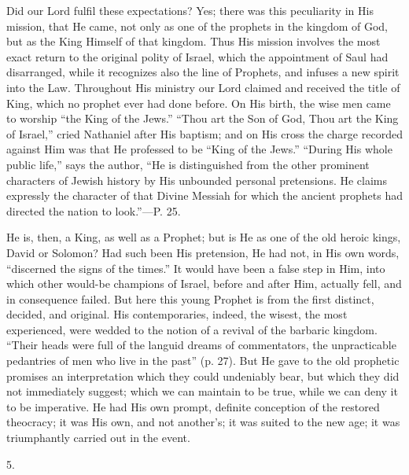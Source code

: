 Did our Lord fulfil these expectations? Yes;
there was this peculiarity in His mission, that He came, not only as
one of the prophets in the kingdom of God, but as the King Himself of
that kingdom. Thus His mission involves the most exact return to the
original polity of Israel, which the appointment of Saul had
disarranged, while it recognizes also the line of Prophets, and
infuses a new spirit into the Law. Throughout His ministry our Lord
claimed and received the title of King, which no prophet ever had done
before. On His birth, the wise men came to worship ``the King of the
Jews.'' ``Thou art the Son of God, Thou art the King of Israel,'' cried
Nathaniel after His baptism; and on His cross the charge recorded
against Him was that He professed to be ``King of the Jews.'' ``During
His whole public life,'' says the author, ``He is distinguished from the
other prominent characters of Jewish history by His unbounded personal
pretensions. He claims expressly the character of that Divine Messiah
for which the ancient prophets had directed the nation to look.''—P.
25.

He is, then, a King, as well as a Prophet; but is
He as one of the old heroic kings, David or Solomon? Had such
been His pretension, He had not, in His own words, ``discerned the
signs of the times.'' It would have been a false step in Him, into
which other would-be champions of Israel, before and after Him,
actually fell, and in consequence failed. But here this young Prophet
is from the first distinct, decided, and original. His contemporaries,
indeed, the wisest, the most experienced, were wedded to the notion of
a revival of the barbaric kingdom. ``Their heads were full of the
languid dreams of commentators, the unpracticable pedantries of men
who live in the past'' (p. 27). But He gave to the old prophetic
promises an interpretation which they could undeniably bear, but which
they did not immediately suggest; which we can maintain to be true,
while we can deny it to be imperative. He had His own prompt, definite
conception of the restored theocracy; it was His own, and not another's;
it was suited to the new age; it was triumphantly carried out in the
event.

5.

